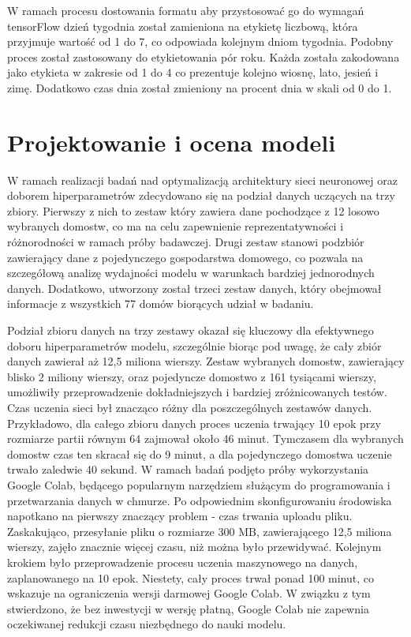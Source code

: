\documentclass[a4paper,twoside,12pt]{book}
\begin{document}
W ramach procesu dostowania formatu aby przystosować go do wymagań tensorFlow dzień tygodnia został zamieniona na etykietę liczbową, która przyjmuje wartość od 1 do 7, co odpowiada kolejnym dniom tygodnia. Podobny proces został zastosowany do etykietowania pór roku. Każda została zakodowana jako etykieta w zakresie od 1 do 4 co prezentuje kolejno wiosnę, lato, jesień i zimę. Dodatkowo czas dnia został zmieniony na procent dnia w skali od 0 do 1.
\section{Projektowanie i ocena modeli}
W ramach realizacji badań nad optymalizacją architektury sieci neuronowej oraz doborem hiperparametrów zdecydowano się na podział danych uczących na trzy zbiory. Pierwszy z nich to zestaw który zawiera dane pochodzące z 12 losowo wybranych domostw, co ma na celu zapewnienie reprezentatywności i różnorodności w ramach próby badawczej. Drugi zestaw stanowi podzbiór zawierający dane z pojedynczego gospodarstwa domowego, co pozwala na szczegółową analizę wydajności modelu w warunkach bardziej jednorodnych danych. Dodatkowo, utworzony został trzeci zestaw danych, który obejmował informacje z wszystkich 77 domów biorących udział w badaniu.


Podział zbioru danych na trzy zestawy okazał się kluczowy dla efektywnego doboru hiperparametrów modelu, szczególnie biorąc pod uwagę, że cały zbiór danych zawierał aż 12,5 miliona wierszy. Zestaw wybranych domostw, zawierający blisko 2 miliony wierszy, oraz pojedyncze domostwo z 161 tysiącami wierszy, umożliwiły przeprowadzenie dokładniejszych i bardziej zróżnicowanych testów. Czas uczenia sieci był znacząco różny dla poszczególnych zestawów danych. Przykładowo, dla całego zbioru danych proces uczenia trwający 10 epok przy rozmiarze partii równym 64 zajmował około 46 minut. Tymczasem dla wybranych domostw czas ten skracał się do 9 minut, a dla pojedynczego domostwa uczenie trwało zaledwie 40 sekund. W ramach badań podjęto próby wykorzystania Google Colab, będącego popularnym narzędziem służącym do programowania i przetwarzania danych w chmurze. Po odpowiednim skonfigurowaniu środowiska napotkano na pierwszy znaczący problem - czas trwania uploadu pliku. Zaskakująco, przesyłanie pliku o rozmiarze 300 MB, zawierającego 12,5 miliona wierszy, zajęło znacznie więcej czasu, niż można było przewidywać. Kolejnym krokiem było przeprowadzenie procesu uczenia maszynowego na danych, zaplanowanego na 10 epok. Niestety, cały proces trwał ponad 100 minut, co wskazuje na ograniczenia wersji darmowej Google Colab. W związku z tym stwierdzono, że bez inwestycji w wersję płatną, Google Colab nie zapewnia oczekiwanej redukcji czasu niezbędnego do nauki modelu.\\
\end{document}
